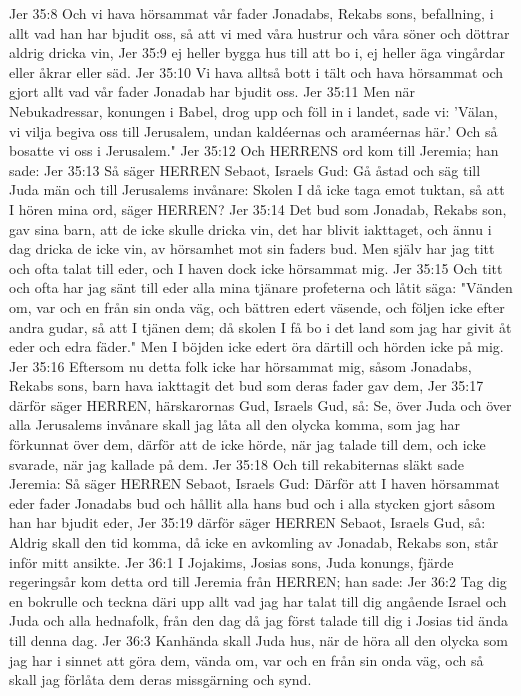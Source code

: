 Jer 35:8  Och vi hava hörsammat vår fader Jonadabs, Rekabs sons, befallning, i allt vad han har bjudit oss, så att vi med våra hustrur och våra söner och döttrar aldrig dricka vin,
Jer 35:9  ej heller bygga hus till att bo i, ej heller äga vingårdar eller åkrar eller säd.
Jer 35:10  Vi hava alltså bott i tält och hava hörsammat och gjort allt vad vår fader Jonadab har bjudit oss.
Jer 35:11  Men när Nebukadressar, konungen i Babel, drog upp och föll in i landet, sade vi: 'Välan, vi vilja begiva oss till Jerusalem, undan kaldéernas och araméernas här.' Och så bosatte vi oss i Jerusalem."
Jer 35:12  Och HERRENS ord kom till Jeremia; han sade:
Jer 35:13  Så säger HERREN Sebaot, Israels Gud: Gå åstad och säg till Juda män och till Jerusalems invånare: Skolen I då icke taga emot tuktan, så att I hören mina ord, säger HERREN?
Jer 35:14  Det bud som Jonadab, Rekabs son, gav sina barn, att de icke skulle dricka vin, det har blivit iakttaget, och ännu i dag dricka de icke vin, av hörsamhet mot sin faders bud. Men själv har jag titt och ofta talat till eder, och I haven dock icke hörsammat mig.
Jer 35:15  Och titt och ofta har jag sänt till eder alla mina tjänare profeterna och låtit säga: "Vänden om, var och en från sin onda väg, och bättren edert väsende, och följen icke efter andra gudar, så att I tjänen dem; då skolen I få bo i det land som jag har givit åt eder och edra fäder." Men I böjden icke edert öra därtill och hörden icke på mig.
Jer 35:16  Eftersom nu detta folk icke har hörsammat mig, såsom Jonadabs, Rekabs sons, barn hava iakttagit det bud som deras fader gav dem,
Jer 35:17  därför säger HERREN, härskarornas Gud, Israels Gud, så: Se, över Juda och över alla Jerusalems invånare skall jag låta all den olycka komma, som jag har förkunnat över dem, därför att de icke hörde, när jag talade till dem, och icke svarade, när jag kallade på dem.
Jer 35:18  Och till rekabiternas släkt sade Jeremia: Så säger HERREN Sebaot, Israels Gud: Därför att I haven hörsammat eder fader Jonadabs bud och hållit alla hans bud och i alla stycken gjort såsom han har bjudit eder,
Jer 35:19  därför säger HERREN Sebaot, Israels Gud, så: Aldrig skall den tid komma, då icke en avkomling av Jonadab, Rekabs son, står inför mitt ansikte.
Jer 36:1  I Jojakims, Josias sons, Juda konungs, fjärde regeringsår kom detta ord till Jeremia från HERREN; han sade:
Jer 36:2  Tag dig en bokrulle och teckna däri upp allt vad jag har talat till dig angående Israel och Juda och alla hednafolk, från den dag då jag först talade till dig i Josias tid ända till denna dag.
Jer 36:3  Kanhända skall Juda hus, när de höra all den olycka som jag har i sinnet att göra dem, vända om, var och en från sin onda väg, och så skall jag förlåta dem deras missgärning och synd.
